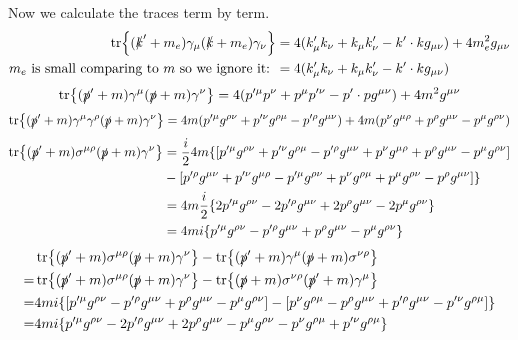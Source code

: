 \documentclass{article}
\newcommand{\gm}{\gamma^{\mu}} \newcommand{\gn}{\gamma^{\nu}}
\newcommand{\s}{\sigma} \renewcommand{\G}{\Gamma}
\newcommand{\ks}{\slashed k}
\renewcommand{\G}{\Gamma}
\begin{document}
Now we calculate the traces term by term.
\begin{align*}
  \tr{(\ks'+m_e)\g_{\mu}(\ks+m_e)\g_{\nu}}&=4(k'_{\mu}k_{\nu}+k_{\mu}k'_{\nu}-k'\cdot kg_{\mu\nu})+4m_e^2g_{\mu\nu}\\\text{$m_e$ is small comparing to $m$ so we ignore it: }&=4(k'_{\mu}k_{\nu}+k_{\mu}k'_{\nu}-k'\cdot kg_{\mu\nu})
\end{align*}
\begin{align*}
  \tr{(\ps'+m)\gm(\ps+m)\gn}=4(p'^{\mu}p^{\nu}+p^{\mu}p'^{\nu}-p'\cdot pg^{\mu\nu})+4m^2g^{\mu\nu}
\end{align*}
\begin{align*}
  \tr{(\ps'+m)\gm\gr(\ps+m)\gn}=4m(p'^{\mu}g^{\rho\nu}+p'^{\nu}g^{\rho\mu}-p'^{\rho}g^{\mu\nu})+4m(p^{\nu}g^{\mu\rho}+p^{\rho}g^{\mu\nu}-p^{\mu}g^{\rho\nu})
\end{align*}
\begin{align*}
  \tr{(\ps'+m)\s^{\mu\rho}(\ps+m)\gn}&=\frac{i}{2}4m\{\bqty{p'^{\mu}g^{\rho\nu}+p'^{\nu}g^{\rho\mu}-p'^{\rho}g^{\mu\nu}+p^{\nu}g^{\mu\rho}+p^{\rho}g^{\mu\nu}-p^{\mu}g^{\rho\nu}}\\&-\bqty{p'^{\rho}g^{\mu\nu}+p'^{\nu}g^{\mu\rho}-p'^{\mu}g^{\rho\nu}+p^{\nu}g^{\rho\mu}+p^{\mu}g^{\rho\nu}-p^{\rho}g^{\mu\nu}}\}\\
  &=4m\frac{i}{2}\{2p'^{\mu}g^{\rho\nu}-2p'^{\rho}g^{\mu\nu}+2p^{\rho}g^{\mu\nu}-2p^{\mu}g^{\rho\nu}\}\\
  &=4mi\{p'^{\mu}g^{\rho\nu}-p'^{\rho}g^{\mu\nu}+p^{\rho}g^{\mu\nu}-p^{\mu}g^{\rho\nu}\}
\end{align*}
\begin{align*}
  &\tr{(\ps'+m)\s^{\mu\rho}(\ps+m)\gn}-\tr{(\ps'+m)\gm(\ps+m)\s^{\nu\rho}}\\=&\tr{(\ps'+m)\s^{\mu\rho}(\ps+m)\gn}-\tr{(\ps+m)\s^{\nu\rho}(\ps'+m)\gm}\\
  =&4mi\{[p'^{\mu}g^{\rho\nu}-p'^{\rho}g^{\mu\nu}+p^{\rho}g^{\mu\nu}-p^{\mu}g^{\rho\nu}]-[p^{\nu}g^{\rho\mu}-p^{\rho}g^{\mu\nu}+p'^{\rho}g^{\mu\nu}-p'^{\nu}g^{\rho\mu}]\}\\
  =&4mi\{p'^{\mu}g^{\rho\nu}-2p'^{\rho}g^{\mu\nu}+2p^{\rho}g^{\mu\nu}-p^{\mu}g^{\rho\nu}-p^{\nu}g^{\rho\mu}+p'^{\nu}g^{\rho\mu}\}
\end{align*}
\end{document}
